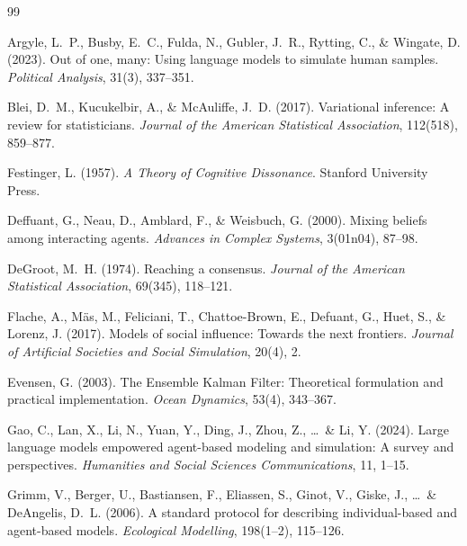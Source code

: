 \documentclass[12pt]{article}
\begin{document}
\begin{thebibliography}{99}

Argyle, L.~P., Busby, E.~C., Fulda, N., Gubler, J.~R., Rytting, C., \& Wingate, D. (2023).
\newblock Out of one, many: Using language models to simulate human samples.
\newblock \textit{Political Analysis}, 31(3), 337--351.

Blei, D.~M., Kucukelbir, A., \& McAuliffe, J.~D. (2017).
\newblock Variational inference: A review for statisticians.
\newblock \textit{Journal of the American Statistical Association}, 112(518), 859--877.

Festinger, L. (1957).
\newblock \textit{A Theory of Cognitive Dissonance}.
\newblock Stanford University Press.

Deffuant, G., Neau, D., Amblard, F., \& Weisbuch, G. (2000).
\newblock Mixing beliefs among interacting agents.
\newblock \textit{Advances in Complex Systems}, 3(01n04), 87--98.

DeGroot, M.~H. (1974).
\newblock Reaching a consensus.
\newblock \textit{Journal of the American Statistical Association}, 69(345), 118--121.

Flache, A., M\"as, M., Feliciani, T., Chattoe-Brown, E., Defuant, G., Huet, S., \& Lorenz, J. (2017).
\newblock Models of social influence: Towards the next frontiers.
\newblock \textit{Journal of Artificial Societies and Social Simulation}, 20(4), 2.

Evensen, G. (2003).
\newblock The Ensemble Kalman Filter: Theoretical formulation and practical implementation.
\newblock \textit{Ocean Dynamics}, 53(4), 343--367.

Gao, C., Lan, X., Li, N., Yuan, Y., Ding, J., Zhou, Z., \ldots\ \& Li, Y. (2024).
\newblock Large language models empowered agent-based modeling and simulation: A survey and perspectives.
\newblock \textit{Humanities and Social Sciences Communications}, 11, 1--15.

Grimm, V., Berger, U., Bastiansen, F., Eliassen, S., Ginot, V., Giske, J., \ldots\ \& DeAngelis, D.~L. (2006).
\newblock A standard protocol for describing individual-based and agent-based models.
\newblock \textit{Ecological Modelling}, 198(1--2), 115--126.


\end{thebibliography}
\end{document}
